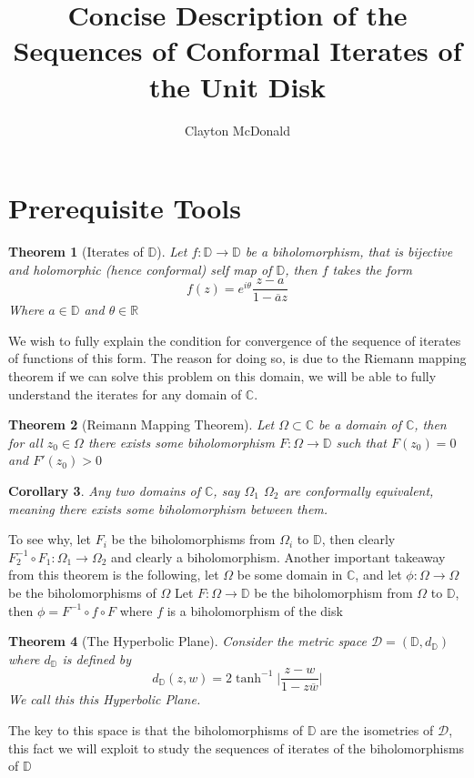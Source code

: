 \documentclass{article}
\title{Concise Description of the Sequences of Conformal Iterates of the Unit Disk}
\author{Clayton McDonald}
\newcommand{\R}{\mathbb{R}}
\newcommand{\C}{\mathbb{C}}
\newcommand{\D}{\mathbb{D}}
\newtheorem{theorem}{Theorem}
\newtheorem{corollary}[theorem]{Corollary}
\begin{document}
\maketitle
\section{Prerequisite Tools}

\begin{theorem}[Iterates of $\D$]
    Let $f:\D\to\D$ be a biholomorphism, that is bijective and holomorphic (hence conformal) self map of $\D$, then $f$ takes the form
    \begin{equation*}
        f(z) = e^{i\theta} \frac{z-a}{1-\overline{a}z}
    \end{equation*}
Where $a\in\D$ and $\theta\in\R$
\end{theorem}
We wish to fully explain the condition for convergence of the sequence of iterates of functions of this form.
The reason for doing so, is due to the Riemann mapping theorem if we can solve this problem on this domain, we will be able to fully understand
the iterates for any domain of $\C$. 
\begin{theorem}[Reimann Mapping Theorem]
Let $\Omega\subset\C$ be a domain of $\C$, then for all $z_0\in\Omega$ there exists some biholomorphism $F:\Omega\to\D$ such that $F(z_0) = 0$ and $F'(z_0)>0$
\end{theorem}
\begin{corollary}
    Any two domains of $\C$, say $\Omega_1$ $\Omega_2$ are conformally equivalent, meaning there exists some biholomorphism between them.
\end{corollary}
To see why, let $F_i$ be the biholomorphisms from $\Omega_i$ to $\D$, then clearly $F_2^{-1} \circ F_1:\Omega_1\to\Omega_2$ and clearly a biholomorphism. 
Another important takeaway from this theorem is the following, let $\Omega$ be some domain in $\C$, and let $\phi:\Omega\to\Omega$ be the biholomorphisms of $\Omega$
Let $F:\Omega\to\D$ be the biholomorphism from $\Omega$ to $\D$, then $\phi = F^{-1}\circ f\circ F$ where $f$ is a biholomorphism of the disk 
\begin{theorem}[The Hyperbolic Plane]
    Consider the metric space $\mathcal{D} = (\D, d_\D)$ where $d_\D$ is defined by
    \begin{equation*}
        d_\D (z, w) = 2 \tanh^{-1}\bigg|\frac{z-w}{1-z\overline{w}} \bigg|
    \end{equation*}
We call this this Hyperbolic Plane.
\end{theorem}
The key to this space is that the biholomorphisms of $\D$ are the isometries of $\mathcal{D}$, this fact we will exploit to study the sequences of iterates of the biholomorphisms of $\D$
\end{document}
